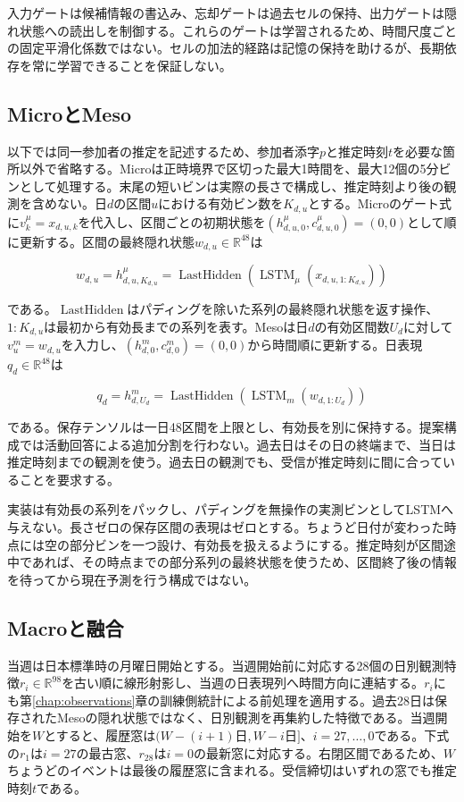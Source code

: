 入力ゲートは候補情報の書込み、忘却ゲートは過去セルの保持、出力ゲートは隠れ状態への読出しを制御する。これらのゲートは学習されるため、時間尺度ごとの固定平滑化係数ではない。セルの加法的経路は記憶の保持を助けるが、長期依存を常に学習できることを保証しない。

\subsection{MicroとMeso}

以下では同一参加者の推定を記述するため、参加者添字\(p\)と推定時刻\(t\)を必要な箇所以外で省略する。Microは正時境界で区切った最大1時間を、最大12個の5分ビンとして処理する。末尾の短いビンは実際の長さで構成し、推定時刻より後の観測を含めない。日\(d\)の区間\(u\)における有効ビン数を\(K_{d,u}\)とする。Microのゲート式に\(v_k^\mu=x_{d,u,k}\)を代入し、区間ごとの初期状態を\((h^\mu_{d,u,0},c^\mu_{d,u,0})=(0,0)\)として順に更新する。区間の最終隠れ状態\(w_{d,u}\in\mathbb R^{48}\)は

\[
w_{d,u}=h^\mu_{d,u,K_{d,u}}
=\operatorname{LastHidden}\left(\operatorname{LSTM}_{\mu}(x_{d,u,1:K_{d,u}})\right)
\]

である。\(\operatorname{LastHidden}\)はパディングを除いた系列の最終隠れ状態を返す操作、\(1:K_{d,u}\)は最初から有効長までの系列を表す。Mesoは日\(d\)の有効区間数\(U_d\)に対して\(v_u^m=w_{d,u}\)を入力し、\((h^m_{d,0},c^m_{d,0})=(0,0)\)から時間順に更新する。日表現\(q_d\in\mathbb R^{48}\)は

\[
q_d=h^m_{d,U_d}
=\operatorname{LastHidden}\left(\operatorname{LSTM}_{m}(w_{d,1:U_d})\right)
\]

である。保存テンソルは一日48区間を上限とし、有効長を別に保持する。提案構成では活動回答による追加分割を行わない。過去日はその日の終端まで、当日は推定時刻までの観測を使う。過去日の観測でも、受信が推定時刻に間に合っていることを要求する。

実装は有効長の系列をパックし、パディングを無操作の実測ビンとしてLSTMへ与えない。長さゼロの保存区間の表現はゼロとする。ちょうど日付が変わった時点には空の部分ビンを一つ設け、有効長を扱えるようにする。推定時刻が区間途中であれば、その時点までの部分系列の最終状態を使うため、区間終了後の情報を待ってから現在予測を行う構成ではない。

\subsection{Macroと融合}

当週は日本標準時の月曜日開始とする。当週開始前に対応する28個の日別観測特徴\(r_i\in\mathbb R^{98}\)を古い順に線形射影し、当週の日表現列へ時間方向に連結する。\(r_i\)にも第\ref{chap:observations}章の訓練側統計による前処理を適用する。過去28日は保存されたMesoの隠れ状態ではなく、日別観測を再集約した特徴である。当週開始を\(W\)とすると、履歴窓は\((W-(i+1)\text{日},W-i\text{日}]\)、\(i=27,\ldots,0\)である。下式の\(r_1\)は\(i=27\)の最古窓、\(r_{28}\)は\(i=0\)の最新窓に対応する。右閉区間であるため、\(W\)ちょうどのイベントは最後の履歴窓に含まれる。受信締切はいずれの窓でも推定時刻\(t\)である。

